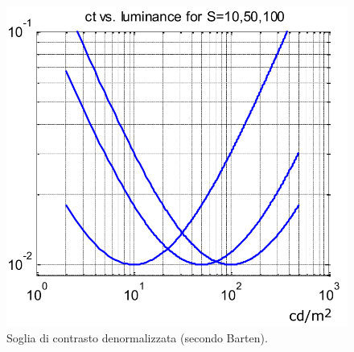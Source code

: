 \documentclass[a4paper,11pt]{article}
\begin{document}
\renewcommand{\thefigure}{2.9}
\begin{figure}[!h]
  \centering
    \includegraphics[scale=0.5]{images/2/ct.png}
    \caption{Soglia di contrasto denormalizzata (secondo Barten).}
\end{figure}
\end{document}
